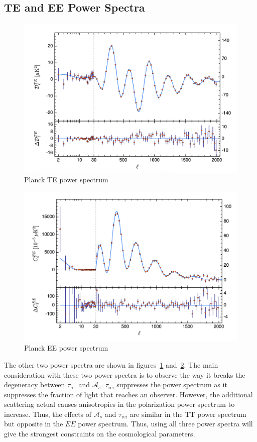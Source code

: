 \subsection{TE and EE Power Spectra}
\begin{figure}
    \centering
    \includegraphics[width=12cm]{plots/planck_TE.png}
    \caption{Planck TE power spectrum}
    \label{fig:planck_te}
\end{figure}
\begin{figure}
    \centering
    \includegraphics[width=12cm]{plots/planck_EE.png}
    \caption{Planck EE power spectrum}
    \label{fig:planck_ee}
\end{figure}
The other two power spectra are shown in figures~\ref{fig:planck_te} and~\ref{fig:planck_ee}. The main consideration with these two power spectra is to observe the way it breaks the degeneracy between $\tau_\mathrm{rei}$ and $\mathcal{A}_s$. $\tau_{\mathrm{rei}}$ suppresses the power spectrum as it suppresses the fraction of light that reaches an observer. However, the additional scattering actual causes anisotropies in the polarization power spectrum to increase. Thus, the effects of $\mathcal{A}_s$ and $\tau_\mathrm{rei}$ are similar in the TT power spectrum but opposite in the $EE$ power spectrum. Thus, using all three power spectra will give the strongest constraints on the cosmological parameters.
